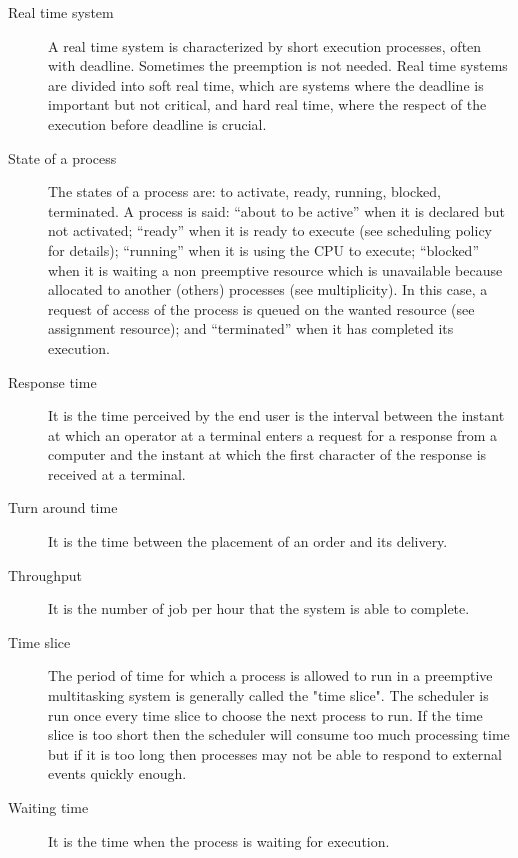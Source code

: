 \documentclass[10pt,a4paper,twoside,titlepage]{article}
\begin{document}
\begin{description}
 \item [Real time system] A real time system is characterized by short execution processes, often with deadline. Sometimes the preemption is not needed. Real time systems are divided into soft real time, which are systems where the deadline is important but not critical, and hard real time, where the respect of the execution before deadline is crucial.
 \item [State of a process] The states of a process are: to activate, ready, running, blocked, terminated. A process is said: ``about to be active'' when it is declared but not activated; ``ready'' when it is ready to execute (see scheduling policy for details); ``running'' when it is using the CPU to execute; ``blocked'' when it is waiting a non preemptive resource which is unavailable because allocated to another (others) processes (see multiplicity). In this case, a request of access of the process is queued on the wanted resource (see assignment resource); and ``terminated'' when it has completed its execution.
 \item [Response time] It is the time perceived by the end user is the interval between the instant at which an operator at a terminal enters a request for a response from a computer and the instant at which the first character of the response is received at a terminal.
 \item [Turn around time] It is the time between the placement of an order and its delivery.
 \item [Throughput] It is the number of job per hour that the system is able to complete.
 \item [Time slice] The period of time for which a process is allowed to run in a preemptive multitasking system is generally called the "time slice". The scheduler is run once every time slice to choose the next process to run. If the time slice is too short then the scheduler will consume too much processing time but if it is too long then processes may not be able to respond to external events quickly enough.
 \item [Waiting time] It is the time when the process is waiting for execution.
\end{description}
\end{document}
